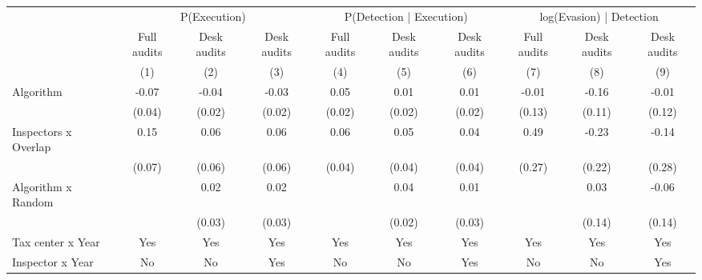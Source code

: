 \begin{tabular}{lccc|ccc|ccc} \toprule
\multicolumn{1}{l}{} & \multicolumn{3}{c}{P(Execution)} & \multicolumn{3}{c}{P(Detection | Execution)} & \multicolumn{3}{c}{log(Evasion) | Detection} \\\cmidrule(lr){2-4}\cmidrule(lr){5-7}\cmidrule(lr){8-10} \multicolumn{1}{l}{} & Full audits & Desk audits & Desk audits & Full audits & Desk audits & Desk audits & Full audits & Desk audits & Desk audits \\ \multicolumn{1}{l}{} & (1) & (2) & (3) & (4) & (5) & (6) & (7) & (8) & (9) \\ \midrule
Algorithm   &       -0.07\sym{**} &       -0.04         &       -0.03         &        0.05\sym{***}&        0.01         &        0.01         &       -0.01         &       -0.16         &       -0.01         \\
            &      (0.04)         &      (0.02)         &      (0.02)         &      (0.02)         &      (0.02)         &      (0.02)         &      (0.13)         &      (0.11)         &      (0.12)         \\
\addlinespace
Inspectors x Overlap&        0.15\sym{**} &        0.06         &        0.06         &        0.06\sym{*}  &        0.05         &        0.04         &        0.49\sym{*}  &       -0.23         &       -0.14         \\
            &      (0.07)         &      (0.06)         &      (0.06)         &      (0.04)         &      (0.04)         &      (0.04)         &      (0.27)         &      (0.22)         &      (0.28)         \\
\addlinespace
Algorithm x Random&                     &        0.02         &        0.02         &                     &        0.04\sym{*}  &        0.01         &                     &        0.03         &       -0.06         \\
            &                     &      (0.03)         &      (0.03)         &                     &      (0.02)         &      (0.03)         &                     &      (0.14)         &      (0.14)         \\
\midrule
Tax center x Year&         Yes         &         Yes         &         Yes         &         Yes         &         Yes         &         Yes         &         Yes         &         Yes         &         Yes         \\
Inspector x Year&          No         &          No         &         Yes         &          No         &          No         &         Yes         &          No         &          No         &         Yes         \\

\end{tabular}
